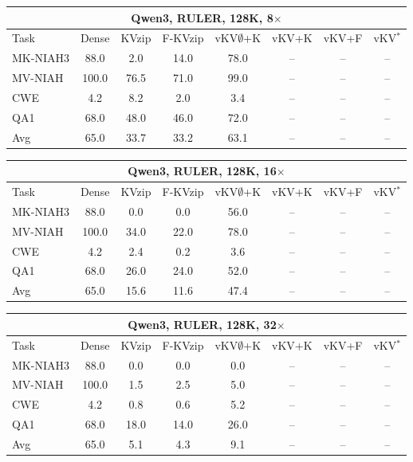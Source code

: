 \begin{tabular}{lccccccc}
\toprule
\multicolumn{8}{c}{Qwen3, RULER, 128K, 8$\times$} \\
\midrule
Task & Dense & KVzip & F-KVzip & vKV$\emptyset$+K & vKV+K & vKV+F & vKV$^\ast$ \\
\midrule
MK-NIAH3 & 88.0 & 2.0 & 14.0 & 78.0 & -- & -- & -- \\
MV-NIAH & 100.0 & 76.5 & 71.0 & 99.0 & -- & -- & -- \\
CWE & 4.2 & 8.2 & 2.0 & 3.4 & -- & -- & -- \\
QA1 & 68.0 & 48.0 & 46.0 & 72.0 & -- & -- & -- \\
\midrule
Avg & 65.0 & 33.7 & 33.2 & 63.1 & -- & -- & -- \\
\bottomrule
\end{tabular}
\vspace{0.8em}

\begin{tabular}{lccccccc}
\toprule
\multicolumn{8}{c}{Qwen3, RULER, 128K, 16$\times$} \\
\midrule
Task & Dense & KVzip & F-KVzip & vKV$\emptyset$+K & vKV+K & vKV+F & vKV$^\ast$ \\
\midrule
MK-NIAH3 & 88.0 & 0.0 & 0.0 & 56.0 & -- & -- & -- \\
MV-NIAH & 100.0 & 34.0 & 22.0 & 78.0 & -- & -- & -- \\
CWE & 4.2 & 2.4 & 0.2 & 3.6 & -- & -- & -- \\
QA1 & 68.0 & 26.0 & 24.0 & 52.0 & -- & -- & -- \\
\midrule
Avg & 65.0 & 15.6 & 11.6 & 47.4 & -- & -- & -- \\
\bottomrule
\end{tabular}
\vspace{0.8em}

\begin{tabular}{lccccccc}
\toprule
\multicolumn{8}{c}{Qwen3, RULER, 128K, 32$\times$} \\
\midrule
Task & Dense & KVzip & F-KVzip & vKV$\emptyset$+K & vKV+K & vKV+F & vKV$^\ast$ \\
\midrule
MK-NIAH3 & 88.0 & 0.0 & 0.0 & 0.0 & -- & -- & -- \\
MV-NIAH & 100.0 & 1.5 & 2.5 & 5.0 & -- & -- & -- \\
CWE & 4.2 & 0.8 & 0.6 & 5.2 & -- & -- & -- \\
QA1 & 68.0 & 18.0 & 14.0 & 26.0 & -- & -- & -- \\
\midrule
Avg & 65.0 & 5.1 & 4.3 & 9.1 & -- & -- & -- \\
\bottomrule
\end{tabular}
\vspace{0.8em}

